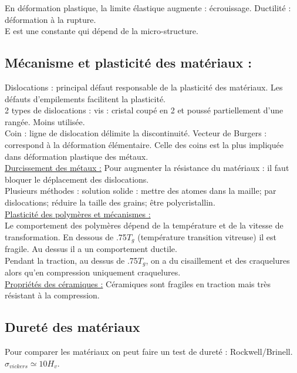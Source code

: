 \documentclass[../main.tex]{subfiles}
\begin{document}
En déformation plastique, la limite élastique augmente : écrouissage. Ductilité : déformation à la rupture. \\
E est une constante qui dépend de la micro-structure. \\

\subsection{Mécanisme et plasticité des matériaux :}
Dislocations : principal défaut responsable de la plasticité des matériaux. Les défauts d'empilements facilitent la plasticité. \\
2 types de dislocations : vis : cristal coupé en 2 et poussé partiellement d'une rangée. Moins utilisée.\\
Coin : ligne de dislocation délimite la discontinuité. Vecteur de Burgers : correspond à la déformation élémentaire. Celle des coins est la plus impliquée dans déformation plastique des métaux.\\


\quad \underline{Durcissement des métaux :}
Pour augmenter la résistance du matériaux : il faut bloquer le déplacement des dislocations. \\
Plusieurs méthodes : solution solide : mettre des atomes dans la maille; par dislocations; réduire la taille des grains; être polycristallin. \\

\quad \underline{Plasticité des polymères et mécanismes :}\\
Le comportement des polymères dépend de la température et de la vitesse de transformation. En dessous de .75$T_g$ (température transition vitreuse) il est fragile. Au dessus il a un comportement ductile. \\
Pendant la traction, au dessus de .75$T_g$, on a du cisaillement et des craquelures alors qu'en compression uniquement craquelures. \\

\quad \underline{Propriétés des céramiques :}
Céramiques sont fragiles en traction mais très résistant à la compression. \\

\subsection{Dureté des matériaux}
Pour comparer les matériaux on peut faire un test de dureté : Rockwell/Brinell.\\
$\sigma_{vickers} \simeq 10H_v$.\\
\end{document}
